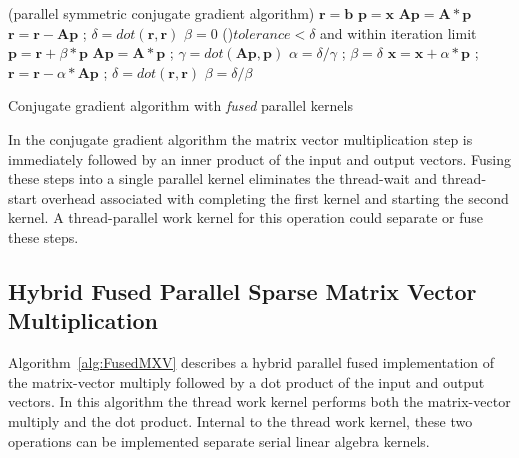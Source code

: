 \begin{algorithm}[h]
\SetLine
\dontprintsemicolon
\Begin(parallel symmetric conjugate gradient algorithm){
$\mathbf{r} = \mathbf{b}$  \;
$\mathbf{p} = \mathbf{x}$  \;
$\mathbf{Ap} = \mathbf{A} * \mathbf{p}$  \;
$\mathbf{r} = \mathbf{r} - \mathbf{Ap}$ ; $\delta = dot(\mathbf{r},\mathbf{r})$  \;
$\beta = 0 $  \; 
\While(){$\mathit{tolerance} < \delta$ and within iteration limit }{ 
  $\mathbf{p} = \mathbf{r} + \beta * \mathbf{p}$  \;
  $\mathbf{Ap} = \mathbf{A} * \mathbf{p}$ ; $\gamma = dot(\mathbf{Ap},\mathbf{p}) $  \;
  $\alpha = \delta / \gamma $ ; $\beta = \delta $  \;
  $\mathbf{x} = \mathbf{x} + \alpha * \mathbf{p}$ ; $\mathbf{r} = \mathbf{r}- \alpha * \mathbf{Ap}$ ; $\delta = dot(\mathbf{r},\mathbf{r})$  \;
  $\beta = \delta / \beta$  \;
}
}
\caption{Conjugate gradient algorithm with \emph{fused} parallel kernels}
\label{alg:CG-fused}
\end{algorithm}


In the conjugate gradient algorithm the matrix vector multiplication step is immediately followed by an inner product of the input and output vectors.
%
Fusing these steps into a single parallel kernel eliminates the thread-wait and thread-start overhead associated with completing the first kernel and starting the second kernel.
%
A thread-parallel work kernel for this operation could separate or fuse these steps.


\clearpage

\subsection{Hybrid Fused Parallel Sparse Matrix Vector Multiplication}

Algorithm~\ref{alg:FusedMXV} describes a hybrid parallel fused implementation of the matrix-vector multiply followed by a dot product of the input and output vectors.
%
In this algorithm the thread work kernel performs both the matrix-vector multiply and the dot product.
%
Internal to the thread work kernel, these two operations can be implemented separate serial linear algebra kernels.


